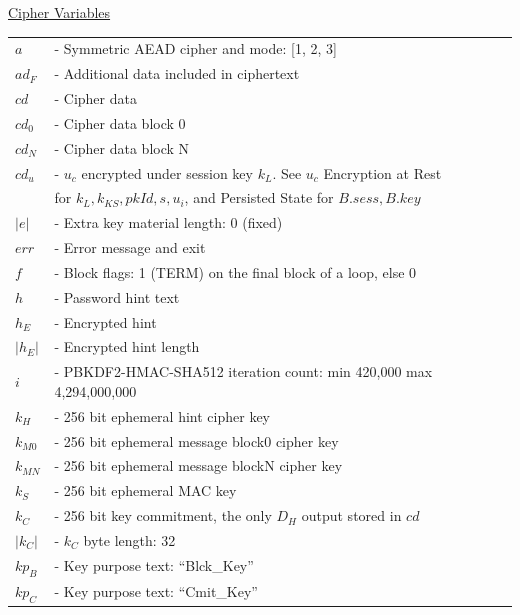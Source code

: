 \documentclass{article}
\newlength{\stanzagap}
\newlength{\stanzawidth}
\newlength{\stanzabox}
\newenvironment{stanza}[1][\stanzawidth]
  {\par\addvspace{\stanzagap}%
   \setlength{\stanzabox}{\dimexpr\linewidth-\parindent\relax}%
   \ifdim\stanzabox>#1\setlength{\stanzabox}{#1}\fi
   \noindent\hspace*{\parindent}\begin{minipage}{\stanzabox}}
  {\end{minipage}\par\addvspace{\stanzagap}}
\begin{document}
\begin{stanza}
\underline{Cipher Variables}\\

\begin{tabular}{@{}p{5mm} l}
$a$ & \textrm{ - Symmetric AEAD cipher and mode: [1, 2, 3]}\\
$\mathit{ad}_F$ & \textrm{ - Additional data included in ciphertext}\\
$\mathit{cd}$ & \textrm{ - Cipher data}\\
$\mathit{cd}_0$ & \textrm{ - Cipher data block 0}\\
$\mathit{cd}_N$ & \textrm{ - Cipher data block N}\\
$\mathit{cd}_u$ & \textrm{ - }$u_c$\textrm{ encrypted under session key }$k_L$\textrm{. See }$u_c$\textrm{ Encryption at Rest}\\
& \phantom{\textrm{ - }}\textrm{for }$k_L, k_{\mathit{KS}}, \mathit{pkId}, s, u_i$\textrm{, and Persisted State for }$B.\mathit{sess}, B.\mathit{key}$\\
$|e|$ & \textrm{ - Extra key material length: 0 (fixed)}\\
$\mathit{err}$ & \textrm{ - Error message and exit}\\
$f$ & \textrm{ - Block flags: 1 (TERM) on the final block of a loop, else 0}\\
$h$ & \textrm{ - Password hint text}\\
$h_E$ & \textrm{ - Encrypted hint}\\
$|h_E|$ & \textrm{ - Encrypted hint length}\\
$i$ & \textrm{ - PBKDF2-HMAC-SHA512 iteration count: min 420,000 max 4,294,000,000}\\
$k_H$ & \textrm{ - 256 bit ephemeral hint cipher key}\\
$k_{M0}$ & \textrm{ - 256 bit ephemeral message block0 cipher key}\\
$k_{MN}$ & \textrm{ - 256 bit ephemeral message blockN cipher key}\\
$k_S$ & \textrm{ - 256 bit ephemeral MAC key}\\
$k_C$ & \textrm{ - 256 bit key commitment, the only }$D_H$\textrm{ output stored in }$\mathit{cd}$\\
$|k_C|$ & \textrm{ - }$k_C$\textrm{ byte length: 32}\\
$\mathit{kp}_B$ & \textrm{ - Key purpose text: ``Blck\_Key''}\\
$\mathit{kp}_C$ & \textrm{ - Key purpose text: ``Cmit\_Key''}\\

\end{tabular}
\end{stanza}
\end{document}
